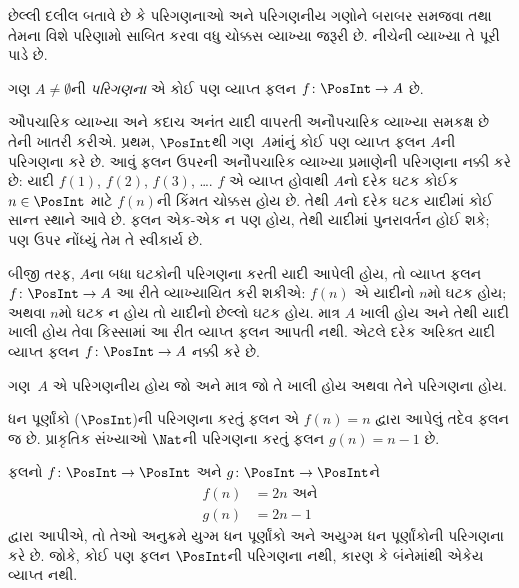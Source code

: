 છેલ્લી દલીલ બતાવે છે કે પરિગણનાઓ અને પરિગણનીય
ગણોને બરાબર સમજવા તથા તેમના વિશે પરિણામો સાબિત કરવા
વધુ ચોક્કસ વ્યાખ્યા જરૂરી છે. નીચેની વ્યાખ્યા તે પૂરી પાડે છે.

\begin{defn}
ગણ $A \neq \emptyset$ની \emph{પરિગણના} એ કોઈ પણ
વ્યાપ્ત ફલન $f \colon \PosInt \to A$ છે.
\end{defn}

\begin{explain}
ઔપચારિક વ્યાખ્યા અને કદાચ અનંત યાદી વાપરતી અનૌપચારિક
વ્યાખ્યા સમકક્ષ છે તેની ખાતરી કરીએ. પ્રથમ,
$\PosInt$થી ગણ~$A$માંનું કોઈ પણ વ્યાપ્ત
ફલન $A$ની પરિગણના કરે છે. આવું ફલન ઉપરની
અનૌપચારિક વ્યાખ્યા પ્રમાણેની પરિગણના નક્કી કરે છે:
યાદી $f(1)$, $f(2)$, $f(3)$, \dots.
$f$ એ વ્યાપ્ત હોવાથી $A$નો દરેક ઘટક
કોઈક~$n \in \PosInt$ માટે $f(n)$ની કિંમત
ચોક્કસ હોય છે. તેથી $A$નો દરેક ઘટક યાદીમાં
કોઈ સાન્ત સ્થાને આવે છે. ફલન એક-એક
ન પણ હોય, તેથી યાદીમાં પુનરાવર્તન હોઈ શકે;
પણ ઉપર નોંધ્યું તેમ તે સ્વીકાર્ય છે.

બીજી તરફ, $A$ના બધા ઘટકોની પરિગણના
કરતી યાદી આપેલી હોય, તો વ્યાપ્ત ફલન
$f\colon \PosInt \to A$ આ રીતે વ્યાખ્યાયિત કરી શકીએ:
$f(n)$ એ યાદીનો $n$મો ઘટક હોય; અથવા
$n$મો ઘટક ન હોય તો યાદીનો છેલ્લો
ઘટક હોય. માત્ર $A$ ખાલી હોય અને તેથી
યાદી ખાલી હોય તેવા કિસ્સામાં આ રીત વ્યાપ્ત
ફલન આપતી નથી. એટલે દરેક અરિક્ત યાદી
વ્યાપ્ત ફલન $f\colon \PosInt \to A$
નક્કી કરે છે.
\end{explain}

\begin{defn}
ગણ~$A$ એ પરિગણનીય હોય જો અને માત્ર જો
તે ખાલી હોય અથવા તેને પરિગણના હોય.
\end{defn}

\begin{ex}
ધન પૂર્ણાંકો ($\PosInt$)ની પરિગણના કરતું ફલન
એ $f(n) = n$ દ્વારા આપેલું તદેવ ફલન જ છે.
પ્રાકૃતિક સંખ્યાઓ $\Nat$ની પરિગણના કરતું ફલન
$g(n) = n - 1$ છે.
\end{ex}

\begin{ex}
ફલનો $f\colon \PosInt \to \PosInt$ અને
$g \colon \PosInt \to
\PosInt$ને
\begin{align*}
f(n) & = 2n \text{ અને}\\
g(n) & = 2n - 1
\end{align*}
દ્વારા આપીએ, તો તેઓ અનુક્રમે યુગ્મ ધન પૂર્ણાંકો અને
અયુગ્મ ધન પૂર્ણાંકોની પરિગણના કરે છે. જોકે, કોઈ પણ
ફલન $\PosInt$ની પરિગણના નથી, કારણ કે બંનેમાંથી
એકેય વ્યાપ્ત નથી.
\end{ex}

